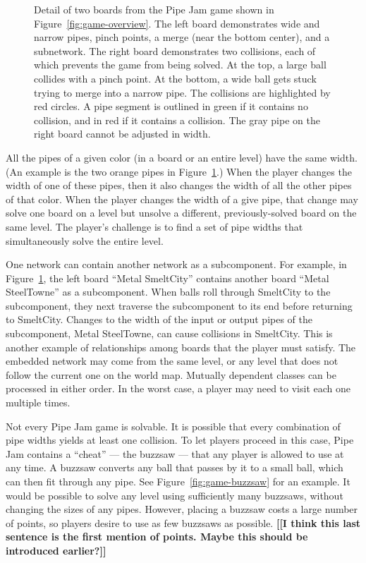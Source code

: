 \documentclass[preprint]{sig-alternate}
\newcommand{\figref}[1]{Figure~\ref{#1}}
\newcommand{\todo}[1]{{\color{red}\bfseries [[#1]]}}
\let\Description =\description
\def\Nospacing{\itemsep=0pt\topsep=0pt\partopsep=0pt\parskip=0pt\parsep=0pt}
\renewenvironment{description}{\Description\Nospacing}{\endlist}
\begin{document}
\begin{description}
\begin{figure}
\caption{
  Detail of two boards from the Pipe Jam game shown in
  \figref{fig:game-overview}.  The left board demonstrates wide and
  narrow pipes, pinch points, a merge (near the bottom center), and a
  subnetwork.  The right board demonstrates two collisions, each of which
  prevents the game from being solved.  At the top, a large ball
  collides with a pinch point.  At the bottom, a wide ball gets stuck
  trying to merge into a narrow pipe.  The collisions are highlighted by
  red circles.  A pipe segment is outlined in green if it contains  no
  collision, and in red if it contains a collision.
  The gray pipe on the right board cannot be adjusted in width.
}
\label{fig:game-detail}
\end{figure}


\item[Linked pipes]
  All the pipes of a given color (in a board or an entire level) have the
  same width.
  (An example is the two orange pipes in \figref{fig:game-detail}.)
  When the player changes the width of one of these pipes,
  then it also changes the width of all the other pipes of that color.
  When the player changes the width of a give pipe, that change may solve
  one board on a level but unsolve a different, previously-solved board on
  the same level.  The player's challenge is to find a set of pipe widths
  that simultaneously solve the entire level.

\item[Embedded networks]
  One network can contain another network as a subcomponent.  For example,
  in \figref{fig:game-detail}, the left board ``Metal SmeltCity''
  contains another board ``Metal SteelTowne'' as a subcomponent.  When
  balls roll through SmeltCity to the subcomponent, they next traverse the
  subcomponent to its end before returning to SmeltCity.  Changes to the
  width of the input or output pipes of the subcomponent, Metal SteelTowne,
  can cause collisions in SmeltCity.  This is another example of
  relationships among boards that the player must satisfy.
  The embedded network may come from the same level, or any level that
  does not follow the current one on the world map.  Mutually dependent
  classes can be processed in either order.  In the worst case, a player
  may need to visit each one multiple times.

\item[Buzzsaws:  Exceptions to the laws of physics]
  Not every Pipe Jam game is solvable.  It is possible that every
  combination of pipe widths yields at least one collision.  To let players
  proceed in this case, Pipe Jam contains a ``cheat'' --- the buzzsaw ---
  that any player is allowed to use at any time.  A buzzsaw converts any
  ball that passes by it to a small ball, which can then fit through any
  pipe.  See \figref{fig:game-buzzsaw} for an example.
  It would be possible to solve any level using sufficiently many buzzsaws,
  without changing the sizes of any pipes.  However, placing a buzzsaw
  costs a large number of points, so players desire to use as few buzzsaws
  as possible.
  \todo{I think this last sentence is the first mention of
    points. Maybe this should be introduced earlier?}


\end{description}
\end{document}
